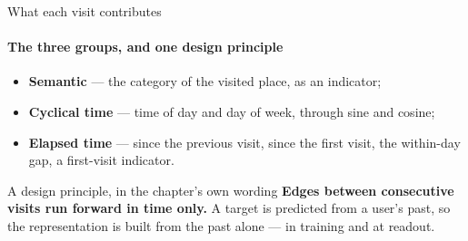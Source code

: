 \documentclass{beamer}
\begin{document}
\begin{frame}{What each visit contributes}\label{fr:visita-passado}%
    \framesubtitle{The three groups, and one design principle}

    \begin{itemize}
        \item \textbf{Semantic} --- the category of the visited place, as an indicator;
        \item \textbf{Cyclical time} --- time of day and day of week, through sine and cosine;
        \item \textbf{Elapsed time} --- since the previous visit, since the first visit,
              the within-day gap, a first-visit indicator.
    \end{itemize}


    \bigskip
    \begin{alertblock}{A design principle, in the chapter's own wording}
        \small
        \textbf{Edges between consecutive visits run forward in time only.} A target is predicted
        from a user's past, so the representation is built from the past alone --- in training and
        at readout.
    \end{alertblock}
\end{frame}
\end{document}

